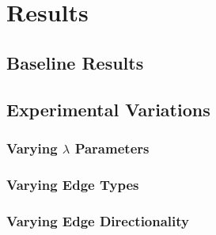 

\section{Results}

\subsection{Baseline Results}

\subsection{Experimental Variations}

\subsubsection{Varying $\lambda$ Parameters}

\subsubsection{Varying Edge Types}

\subsubsection{Varying Edge Directionality}
\label{sec:VaryingEdgeDirectionality}